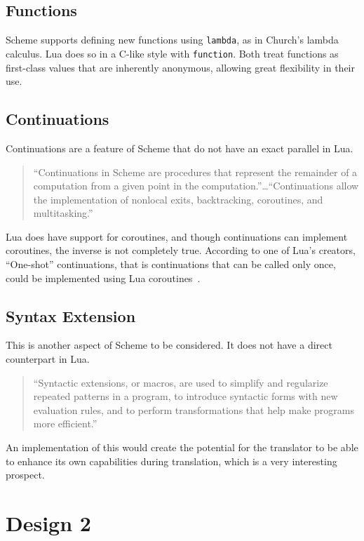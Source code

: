 \subsection{Functions}

Scheme supports defining new functions using \texttt{lambda}, as in Church's
lambda calculus. Lua does so in a C-like style with \texttt{function}. Both
treat functions as first-class values that are inherently anonymous, allowing
great flexibility in their use.

\subsection{Continuations}

Continuations are a feature of Scheme that do not have an exact parallel in Lua.
\begin{quotation}
``Continuations in Scheme are procedures that represent the remainder of a
computation from a given point in the computation.''\ldots``Continuations allow
the implementation of nonlocal exits, backtracking, coroutines, and
multitasking.''~\cite[Sec~5.6]{tspl}
\end{quotation}

Lua does have support for coroutines, and though continuations can implement
coroutines, the inverse is not completely true. According to one of Lua's
creators, ``One-shot'' continuations, that is continuations that can be called
only once, could be implemented using Lua coroutines~\cite[Slide~14]{luaslides}.

\subsection{Syntax Extension}

This is another aspect of Scheme to be considered. It does not have a direct
counterpart in Lua.

\begin{quotation}
``Syntactic extensions, or macros, are used to simplify and regularize repeated
patterns in a program, to introduce syntactic forms with new evaluation rules,
and to perform transformations that help make programs more
efficient.''~\cite[Ch~8]{tspl}
\end{quotation}

An implementation of this would create the potential for the translator to be
able to enhance its own capabilities during translation, which is a very
interesting prospect.


\section{Design 2}

